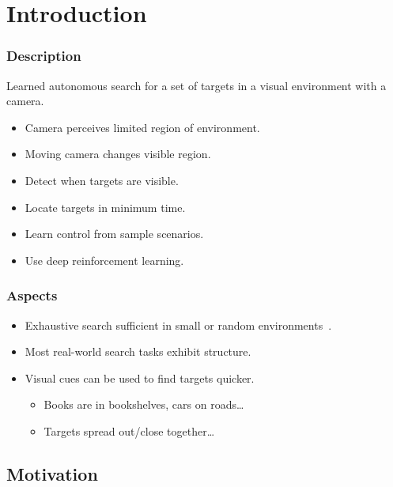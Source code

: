 
\section{Introduction}

\begin{frame}
    \frametitle{Description}
    
    Learned autonomous search for a set of targets in a visual environment with a camera.

    \begin{itemize}
        \item Camera perceives limited region of environment.
        \item Moving camera changes visible region.
        \item Detect when targets are visible.
        \item Locate targets in minimum time.
        \item Learn control from sample scenarios.
        \item Use deep reinforcement learning.
    \end{itemize}
\end{frame}

\begin{frame}
    \frametitle{Aspects}

    \begin{itemize}
        \item Exhaustive search sufficient in small or random environments~\cite{nakayama_situating_2011}.
        \item Most real-world search tasks exhibit structure.
        \item Visual cues can be used to find targets quicker.
        \begin{itemize}
            \item Books are in bookshelves, cars on roads\dots
            \item Targets spread out/close together\dots
        \end{itemize}
    \end{itemize}
\end{frame}

\subsection{Motivation}

